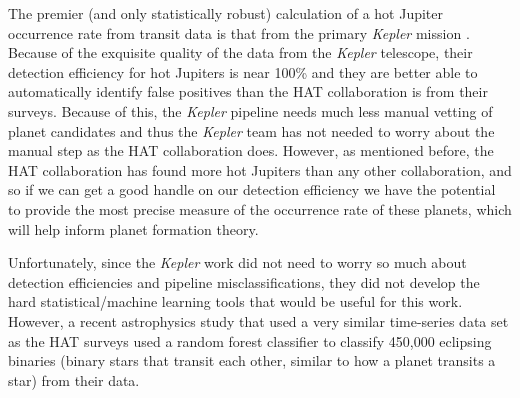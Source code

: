 The premier (and only statistically robust) calculation of a hot Jupiter occurrence rate from transit data is that from the primary {\it Kepler} mission \cite{howard2012}.  Because of the exquisite quality of the data from the {\it Kepler} telescope, their detection efficiency for hot Jupiters is near 100\% and they are better able to automatically identify false positives than the HAT collaboration is from their surveys.  Because of this, the {\it Kepler} pipeline needs much less manual vetting of planet candidates and thus the {\it Kepler} team has not needed to worry about the manual step as the HAT collaboration does.  However, as mentioned before, the HAT collaboration has found more hot Jupiters than any other collaboration, and so if we can get a good handle on our detection efficiency we have the potential to provide the most precise measure of the occurrence rate of these planets, which will help inform planet formation theory.

Unfortunately, since the {\it Kepler} work did not need to worry so much about detection efficiencies and pipeline misclassifications, they did not develop the hard statistical/machine learning tools that would be useful for this work.  However, a recent astrophysics study \cite{ogle2017} that used a very similar time-series data set as the HAT surveys used a random forest classifier to classify 450,000 eclipsing binaries (binary stars that transit each other, similar to how a planet transits a star) from their data.
